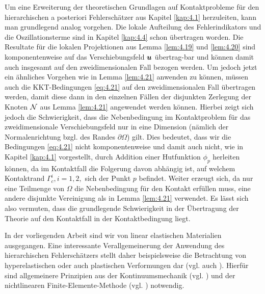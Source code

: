 Um eine Erweiterung der theoretischen Grundlagen auf Kontaktprobleme für den hierarchischen a posteriori Fehlerschätzer aus Kapitel \ref{kap:4.1} herzuleiten, kann man grundlegend analog vorgehen. Die lokale Aufteilung des Fehlerindikators und die Oszillationsterme sind in Kapitel \ref{kap:4.4} schon übertragen worden. Die Resultate für die lokalen Projektionen aus Lemma \ref{lem:4.19} und \ref{lem:4.20} sind komponentenweise auf das Verschiebungsfeld $\boldsymbol u$ übertrag-bar und können damit auch insgesamt auf den zweidimensionalen Fall bezogen werden. Um jedoch jetzt ein ähnliches Vorgehen wie in Lemma \ref{lem:4.21} anwenden zu können, müssen auch die KKT-Bedingungen \eqref{eq:4.21} auf den zweidimensionalen Fall übertragen werden, damit diese dann in den einzelnen Fällen der disjunkten Zerlegung der Knoten $\mathcal N$  aus Lemma \ref{lem:4.21} angewendet werden können. Hierbei zeigt sich jedoch die Schwierigkeit, dass die Nebenbedingung im Kontaktproblem für das zweidimensionale Verschiebungsfeld nur in eine Dimension (nämlich der Normalenrichtung bzgl. des Randes $\partial \Omega$) gilt. Dies bedeutet, dass wir die Bedingungen \eqref{eq:4.21} nicht komponentenweise und damit auch nicht, wie in Kapitel \ref{kap:4.1} vorgestellt, durch Addition einer Hutfunktion $\phi_p$ herleiten können, da im Kontaktfall die Folgerung davon abhängig ist, auf welchem Kontaktrand $\Gamma_c^i, i = 1,2,$ sich der Punkt $p$ befindet. Weiter erzeugt sich, da nur eine Teilmenge von $\Omega$ die Nebenbedingung für den Kontakt erfüllen muss, eine andere disjunkte Vereinigung als in Lemma \ref{lem:4.21} verwendet. Es lässt sich also vermuten, dass die grundlegende Schwierigkeit in der Übertragung der Theorie auf den Kontaktfall in der Kontaktbedingung liegt.

In der vorliegenden Arbeit sind wir von linear elastischen Materialien ausgegangen. Eine interessante Verallgemeinerung der Anwendung des hierarchischen Fehlerschätzers stellt daher beispielsweise die Betrachtung von hyperelastischen oder auch plastischen Verformungen dar (vgl. auch \cite{WriggersContact}). Hierfür sind allgemeinere Prinzipien aus der Kontinuumsmechanik (vgl. \cite{AltKonti}) und der nichtlinearen Finite-Elemente-Methode (vgl. \cite{WriggersFEM}) notwendig.

